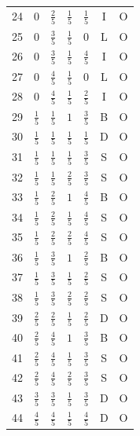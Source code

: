 \documentclass[11pt,a4paper]{article}
\theoremstyle{definition}
\theoremstyle{remark}
\numberwithin{equation}{section}
\begin{document}
{\begin{longtable}{@{}rcccccc@{}}
24&$0$&$\tfrac{2}{5}$&$\tfrac{1}{5}$&$\tfrac{1}{5}$&I&O\\
25&$0$&$\tfrac{3}{5}$&$\tfrac{1}{5}$&$0$&L&O\\
26&$0$&$\tfrac{3}{5}$&$\tfrac{1}{5}$&$\tfrac{4}{5}$&I&O\\
27&$0$&$\tfrac{4}{5}$&$\tfrac{1}{5}$&$0$&L&O\\
28&$0$&$\tfrac{4}{5}$&$\tfrac{1}{5}$&$\tfrac{2}{5}$&I&O\\
29&$\tfrac{1}{5}$&$\tfrac{1}{5}$&$1$&$\tfrac{3}{5}$&B&O\\
30&$\tfrac{1}{5}$&$\tfrac{1}{5}$&$\tfrac{1}{5}$&$\tfrac{1}{5}$&D&O\\
31&$\tfrac{1}{5}$&$\tfrac{1}{5}$&$\tfrac{1}{5}$&$\tfrac{3}{5}$&S&O\\
32&$\tfrac{1}{5}$&$\tfrac{1}{5}$&$\tfrac{2}{5}$&$\tfrac{3}{5}$&S&O\\
33&$\tfrac{1}{5}$&$\tfrac{2}{5}$&$1$&$\tfrac{4}{5}$&B&O\\
34&$\tfrac{1}{5}$&$\tfrac{2}{5}$&$\tfrac{1}{5}$&$\tfrac{4}{5}$&S&O\\
35&$\tfrac{1}{5}$&$\tfrac{2}{5}$&$\tfrac{2}{5}$&$\tfrac{4}{5}$&S&O\\
36&$\tfrac{1}{5}$&$\tfrac{3}{5}$&$1$&$\tfrac{2}{5}$&B&O\\
37&$\tfrac{1}{5}$&$\tfrac{3}{5}$&$\tfrac{1}{5}$&$\tfrac{2}{5}$&S&O\\
38&$\tfrac{1}{5}$&$\tfrac{3}{5}$&$\tfrac{2}{5}$&$\tfrac{2}{5}$&S&O\\
39&$\tfrac{2}{5}$&$\tfrac{2}{5}$&$\tfrac{1}{5}$&$\tfrac{2}{5}$&D&O\\
40&$\tfrac{2}{5}$&$\tfrac{4}{5}$&$1$&$\tfrac{3}{5}$&B&O\\
41&$\tfrac{2}{5}$&$\tfrac{4}{5}$&$\tfrac{1}{5}$&$\tfrac{3}{5}$&S&O\\
42&$\tfrac{2}{5}$&$\tfrac{4}{5}$&$\tfrac{2}{5}$&$\tfrac{3}{5}$&S&O\\
43&$\tfrac{3}{5}$&$\tfrac{3}{5}$&$\tfrac{1}{5}$&$\tfrac{3}{5}$&D&O\\
44&$\tfrac{4}{5}$&$\tfrac{4}{5}$&$\tfrac{1}{5}$&$\tfrac{4}{5}$&D&O\\
\bottomrule
\end{longtable}}
\end{document}
